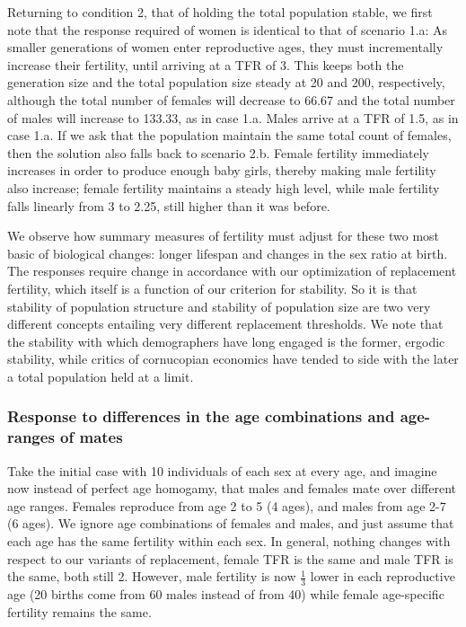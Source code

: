 \documentclass[reqno,12pt,oneside,a4paper]{report} %
\theoremstyle{plain}
\theoremstyle{definition}
\theoremstyle{remark}
\numberwithin{theorem}{chapter}     %
\begin{document}
Returning to condition 2, that of holding the total population stable, we first note that the response required of women is identical to that of scenario 1.a: As smaller generations of women enter reproductive ages, they must incrementally increase their fertility, until arriving at a TFR of 3. This keeps both the generation size and the total population size steady at 20 and 200, respectively, although the total number of females will decrease to 66.67 and the total number of males will increase to 133.33, as in case 1.a. Males arrive at a TFR of 1.5, as in case 1.a. If we ask that the population maintain the same total count of females, then the solution also falls back to scenario 2.b. Female fertility immediately increases in order to produce enough baby girls, thereby making male fertility also increase; female fertility maintains a steady high level, while male fertility falls linearly from 3 to 2.25, still higher than it was before.

We observe how summary measures of fertility must adjust for these two most basic of biological changes: longer lifespan and changes in the sex ratio at birth. The responses require change in accordance with our optimization of replacement fertility, which itself is a function of our criterion for stability. So it is that stability of population structure and stability of population size are two very different concepts entailing very different replacement thresholds. We note that the stability with which demographers have long engaged is the former, ergodic stability, while critics of cornucopian economics have tended to side with the later a total population held at a limit. 

		\subsubsection{Response to differences in the age combinations and age-ranges of mates}

Take the initial case with 10 individuals of each sex at every age, and imagine now instead of perfect age homogamy, that males and females mate over different age ranges. Females reproduce from age 2 to 5 (4 ages), and males from age 2-7 (6 ages). We ignore age combinations of females and males, and just assume that each age has the same fertility within each sex. In general, nothing changes with respect to our variants of replacement, female TFR is the same and male TFR is the same, both still 2. However, male fertility is now $\frac{1}{3}$ lower in each reproductive age (20 births come from 60 males instead of from 40) while female age-specific fertility remains the same.
\end{document}
